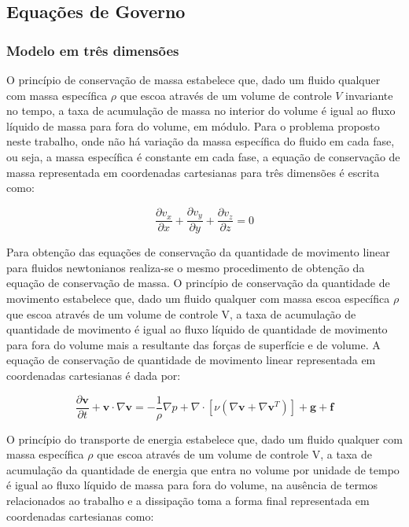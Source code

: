 \documentclass[a4paper,portuges,12pt]{article}
\newcommand{\vvet}{\mathbf{v}}
\begin{document}
\subsection{Equações de Governo}

\subsubsection{Modelo em três dimensões}

O princípio de conservação de massa estabelece que, dado um fluido
qualquer com massa específica $\rho$ que escoa através de um volume de
controle $V$ invariante no tempo, a taxa de acumulação de massa no
interior do volume é igual ao fluxo líquido de massa para fora do
volume, em módulo. Para o problema proposto neste trabalho, onde não há
variação da massa específica do fluido em cada fase, ou seja, a massa
específica é constante em cada fase, a equação de conservação de massa
representada em coordenadas cartesianas para três dimensões é escrita como:

\begin{equation}
	\frac{\partial v_x}{\partial x} +
	\frac{\partial v_y}{\partial y} +
	\frac{\partial v_z}{\partial z}  
	= 
	0
	\label{eq:cm9}
\end{equation}\vspace{0.5cm}

Para obtenção das equações de conservação da quantidade de movimento
linear para fluidos newtonianos realiza-se o mesmo procedimento de
obtenção da equação de conservação de massa. O princípio de conservação
da quantidade de movimento estabelece que, dado um fluido qualquer com
massa escoa específica $\rho$ que escoa através de um volume de controle
V, a taxa de acumulação de quantidade de movimento é igual ao fluxo
líquido de quantidade de movimento para fora do volume mais a resultante
das forças de superfície e de volume. A equação de conservação de
quantidade de movimento linear representada em coordenadas cartesianas é
dada por:

\begin{equation}
	\frac{\partial \vvet}{\partial t} + \vvet \cdot \nabla \vvet
	= 
	- \frac{1}{\rho} \nabla p +
	\nabla \cdot [\nu(\nabla \vvet + \nabla \vvet^T)] + 
	\textbf{g} + 
	\textbf{f}
\label{eq:NS3a}
\end{equation}\vspace{0.5cm}

O princípio do transporte de energia estabelece que, dado um
fluido qualquer com massa específica $\rho$ que escoa através de um
volume de controle V, a taxa de acumulação da quantidade de energia
que entra no volume por unidade de tempo é igual ao fluxo
líquido de massa para fora do volume, na ausência de termos relacionados
ao trabalho e a dissipação toma a forma final representada em
coordenadas cartesianas como:
\end{document}
